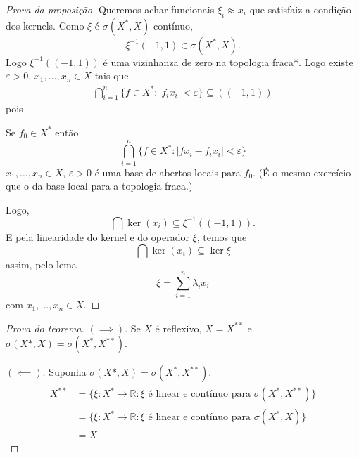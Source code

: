 \documentclass[portuguese]{article}
\theoremstyle{definition}
\newcommand{\R}{\mathbb{R}}
\begin{document}
	\begin{proof}[Prova da proposição]
		Queremos achar funcionais $\xi_i\approx x_i$ que satisfaiz a condição dos kernels. Como $\xi$ é $\sigma(X^*,X)$-contínuo,
		\[\xi^{-1}\left(-1,1\right)\in\sigma(X^*,X).\]
		Logo $\xi^{-1}\left((-1,1)\right)$ é uma vizinhanza de zero na topologia fraca*. Logo existe $\varepsilon>0$, $x_1,\ldots,x_n\in X$ tais que
		\begin{align*}
			\bigcap_{i=1}^n\{f\in X^*:|f_ix_i|<\varepsilon\}\subseteq\left((-1,1)\right)
		\end{align*}
		pois
		\begin{exer*}
			Se $f_0\in X^*$ então
			\[\bigcap_{i=1}^n\{f\in X^*:|fx_i-f_ix_i|<\varepsilon\}\]
			$x_1,\ldots,x_n\in X$, $\varepsilon>0$ é uma base de abertos locais para $f_0$. (É o mesmo exercício que o da base local para a topologia fraca.)
		\end{exer*}
		Logo,
		\[\bigcap\ker(x_i)\subseteq\xi^{-1}\left((-1,1)\right).\]
		E pela linearidade do kernel e do operador $\xi$, temos que
		\[\bigcap\ker(x_i)\subseteq\ker\xi\]
		assim, pelo lema
		\[\xi=\sum_{i=1}^n\lambda_ix_i\]
		com $x_1,\ldots,x_n\in X$.
	\end{proof}
	\begin{proof}[Prova do teorema]\leavevmode
		
		$(\implies)$. Se $X$ é reflexivo, $X=X^{**}$ e $\sigma(X*,X)=\sigma(X^*,X^{**})$.
		
		$(\impliedby)$. Suponha $\sigma(X*,X)=\sigma(X^*,X^{**})$.
		\begin{align*}
			X^{**}&=\{\xi:X^*\to\R:\xi\text{ é linear e contínuo para }\sigma(X^*,X^{**})\}\\
			&=\{\xi:X^*\to\R:\xi\text{ é linear e contínuo para }\sigma(X^*,X)\}\\
			&=X
		\end{align*}
	\end{proof}
	
\end{document}
